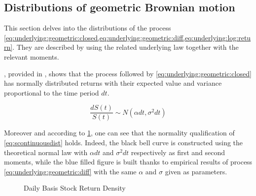 \documentclass[12pt]{report}
\newcommand{\St}{S\left(t\right)}
\newcommand{\dSt}{dS\left(t\right)}
\newcommand{\dSr}{\frac{\dSt}{\St}}
\begin{document}
\subsection{Distributions of geometric Brownian motion}
\label{sub:Distribution of the stock price process}

This section delves into the distributions of the process \ref{eq:underlying:geometric:closed,eq:underlying:geometric:diff,eq:underlying:log:return}. 
They are described by using the related underlying law together with the relevant moments.

, provided in \citet{shreve},  shows that the process followed by \cref{eq:underlying:geometric:closed} has normally distributed returns with their expected value and variance proportional to the time period $dt$.

\begin{center}
\begin{equation}
\dSr \sim N(\alpha dt, \sigma^2 dt)
\label{eq:scontinuousdist}
\end{equation}
\end{center}  
Moreover and according to \cref{p:returndensity}, one can see that the normality qualification of \cref{eq:scontinuousdist} holds. 
Indeed, the black bell curve is constructed using the theoretical normal law with $\alpha dt$ and $\sigma^2 dt$ respectively as first and second moments, while the blue filled figure is built thanks to empirical results of process \ref{eq:underlying:geometric:diff} with the same $\alpha$ and $\sigma$ given as parameters.

 
\begin{figure}[!h]
\centering

\caption{Daily Basis Stock Return Density}
\label{p:returndensity}
\end{figure}
\end{document}
